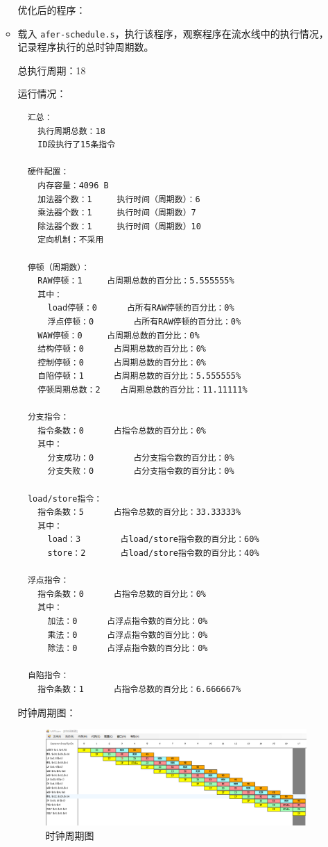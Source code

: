 \documentclass[blue,normal,cn]{elegantnote}
\newcommand{\code}[1]{\colorbox{light-gray}{\texttt{#1}}}
\begin{document}
\begin{enumerate}[wide=0pt, listparindent=2em, parsep=0pt]
\begin{itemize}[leftmargin=3em, listparindent=2em, parsep=0pt]
                \textcolor{ans}{优化后的程序：}

                

          \item  载入 \code{afer-schedule.s}，执行该程序，观察程序在流水线中的执行情况，记录程序执行的总时钟周期数。

                \textcolor{ans}{总执行周期：18}

                \textcolor{ans}{运行情况：}
                \begin{lstlisting}
  汇总：
    执行周期总数：18
    ID段执行了15条指令

  硬件配置：
    内存容量：4096 B
    加法器个数：1		执行时间（周期数）：6
    乘法器个数：1		执行时间（周期数）7		
    除法器个数：1		执行时间（周期数）10		
    定向机制：不采用

  停顿（周期数）：
    RAW停顿：1		占周期总数的百分比：5.555555%
    其中：
      load停顿：0		占所有RAW停顿的百分比：0%
      浮点停顿：0		占所有RAW停顿的百分比：0%
    WAW停顿：0		占周期总数的百分比：0%
    结构停顿：0		占周期总数的百分比：0%
    控制停顿：0		占周期总数的百分比：0%
    自陷停顿：1		占周期总数的百分比：5.555555%
    停顿周期总数：2	占周期总数的百分比：11.11111%

  分支指令：
    指令条数：0		占指令总数的百分比：0%
    其中：
      分支成功：0		占分支指令数的百分比：0%
      分支失败：0		占分支指令数的百分比：0%

  load/store指令：
    指令条数：5		占指令总数的百分比：33.33333%
    其中：
      load：3		占load/store指令数的百分比：60%
      store：2		占load/store指令数的百分比：40%

  浮点指令：
    指令条数：0		占指令总数的百分比：0%
    其中：
      加法：0		占浮点指令数的百分比：0%
      乘法：0		占浮点指令数的百分比：0%
      除法：0		占浮点指令数的百分比：0%

  自陷指令：
    指令条数：1		占指令总数的百分比：6.666667%
\end{lstlisting}

                \textcolor{ans}{时钟周期图：}
                \begin{figure}[H]
                  \centering
                  \includegraphics[width=.8\textwidth]{fig/after-schedule.png}
                  \caption{时钟周期图}
                \end{figure}


\end{itemize}
\end{enumerate}
\end{document}
